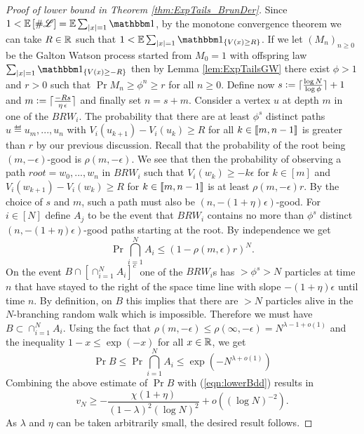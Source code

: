 \begin{proof}[Proof of lower bound in Theorem \ref{thm:ExpTails_BrunDer}]
Since $1 < \Ex{\#\scr{L}} = \E\sum_{|x|=1} \Ind$, by the monotone convergence theorem we can take $R \in \mathbb{R}$ such that $1 < \E\sum_{|x|=1} \Ind_{\{ V(x) \geq R\}}$. If we let $(M_n)_{n \geq 0}$ be the Galton Watson process started from $M_0 = 1$ with offspring law $\sum_{|x|=1} \Ind_{\{ V(x) \geq -R\}}$ then by Lemma \ref{lem:ExpTailsGW} there exist $\phi > 1$ and $r > 0$ such that $\Pr{M_n \geq \phi^n} \geq r$ for all $n \geq 0$. Define now $s \vcentcolon= \lceil\frac{\log N}{\log \phi}\rceil + 1$ and $m \vcentcolon= \lceil\frac{- Rs}{\eta\, \epsilon}\rceil$ and finally set $n = s + m$. Consider a vertex $u$ at depth $m$ in one of the $BRW_i$. The probability that there are at least $\phi^s$ distinct paths $u \eqdef u_m, ..., u_n$ with $V_i(u_{k+1}) - V_i(u_k) \geq R$ for all $k \in \llbracket m, n - 1\rrbracket$ is greater than $r$ by our previous discussion. Recall that the probability of the root being $(m, - \epsilon)$-good is $\rho(m, - \epsilon)$. We see that then the probability of observing a path $root = w_0, ..., w_n$ in $BRW_i$ such that $V_i(w_k) \geq - k \epsilon$ for $k \in [m]$ and $V_i(w_{k+1}) - V_i(w_k) \geq R$ for $k \in \llbracket m, n-1\rrbracket$ is at least $\rho(m, - \epsilon) r$. By the choice of $s$ and $m$, such a path must also be $(n,  - (1+\eta)\epsilon)$-good. For $i \in [N]$ define $A_j$ to be the event that $BRW_i$ contains no more than $\phi^s$ distinct $(n, - (1+\eta)\epsilon)$-good paths starting at the root. By independence we get
\begin{equation}
\Pr{\bigcap\limits_{i=1}^N A_i} \leq (1 - \rho(m, \epsilon) r)^N. 
\end{equation}
On the event $B \cap [\cap_{i=1}^N A_i]^c$ one of the $BRW_i$s has $> \phi^s > N$ particles at time $n$ that have stayed to the right of the space time line with slope $ - (1 + \eta)\epsilon$ until time $n$. By definition, on $B$ this implies that there are $> N$ particles alive in the $N$-branching random walk which is impossible. Therefore we must have $B \subset \cap_{i=1}^N A_i$. Using the fact that $\rho(m, - \epsilon) \leq \rho(\infty, - \epsilon) = N^{\lambda - 1 + o(1)}$ and the inequality $1 - x \leq \exp(-x)$ for all $x \in \mathbb{R}$, we get
\begin{equation}\label{eqn:ExpTailsBBound}
\Pr{B} \leq \Pr{\bigcap\limits_{i=1}^N A_i} \leq \exp(-N^{\lambda + o(1)})
\end{equation}
Combining the above estimate of $\Pr{B}$ with (\ref{eqn:lowerBdd}) results in 
\begin{equation}
v_N \geq - \frac{\chi (1 + \eta)}{(1 - \lambda)^2(\log N)^2} + o((\log N)^{-2}). 
\end{equation} 
As $\lambda$ and $\eta$ can be taken arbitrarily small, the desired result follows. 
\end{proof}

